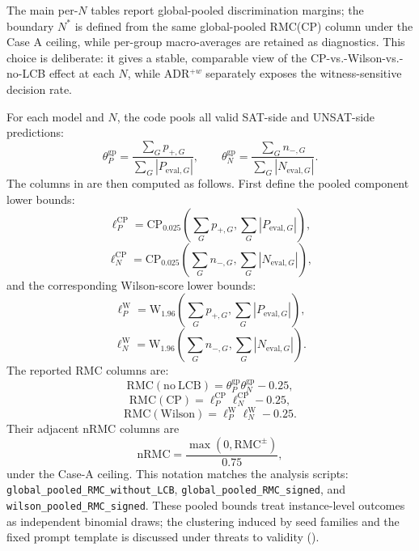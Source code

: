 \documentclass[conference]{IEEEtran}
\theoremstyle{remark}
\newcommand{\RMC}{\mathrm{RMC}}
\begin{document}
The main per-$N$ tables report global-pooled discrimination margins; the
boundary $N^*$ is defined from the same global-pooled RMC(CP) column under the
Case A ceiling, while per-group macro-averages are retained as diagnostics.
This choice is deliberate: it gives a stable, comparable view of the
CP-vs.-Wilson-vs.-no-LCB effect at each $N$, while ADR$^{+w}$ separately exposes
the witness-sensitive decision rate.

For each model and $N$, the code pools all valid SAT-side and UNSAT-side
predictions:
\begin{equation}\label{eq:formula-54}
\theta_P^{\mathrm{gp}}
=
\frac{\sum_G p_{+,G}}{\sum_G |P_{\mathrm{eval},G}|},
\qquad
\theta_N^{\mathrm{gp}}
=
\frac{\sum_G n_{-,G}}{\sum_G |N_{\mathrm{eval},G}|}.
\end{equation}
The columns in  are then computed as follows.
First define the pooled component lower bounds:
\begin{equation}\label{eq:formula-55}
\ell_P^{\mathrm{CP}}
=
\mathrm{CP}_{0.025}
\!\left(
\sum_G p_{+,G},
\sum_G |P_{\mathrm{eval},G}|
\right),
\end{equation}
\begin{equation}\label{eq:formula-56}
\ell_N^{\mathrm{CP}}
=
\mathrm{CP}_{0.025}
\!\left(
\sum_G n_{-,G},
\sum_G |N_{\mathrm{eval},G}|
\right),
\end{equation}
and the corresponding Wilson-score lower bounds:
\begin{equation}\label{eq:formula-57}
\ell_P^{\mathrm{W}}
=
\mathrm{W}_{1.96}
\!\left(
\sum_G p_{+,G},
\sum_G |P_{\mathrm{eval},G}|
\right),
\end{equation}
\begin{equation}\label{eq:formula-58}
\ell_N^{\mathrm{W}}
=
\mathrm{W}_{1.96}
\!\left(
\sum_G n_{-,G},
\sum_G |N_{\mathrm{eval},G}|
\right).
\end{equation}
The reported RMC columns are:
\begin{equation}\label{eq:formula-59}
\mathrm{RMC}(\mathrm{no\ LCB})
=
\theta_P^{\mathrm{gp}}\theta_N^{\mathrm{gp}}
-
0.25,
\end{equation}
\begin{equation}\label{eq:formula-60}
\mathrm{RMC}(\mathrm{CP})
=
\ell_P^{\mathrm{CP}}\ell_N^{\mathrm{CP}}
-
0.25,
\end{equation}
\begin{equation}\label{eq:formula-61}
\mathrm{RMC}(\mathrm{Wilson})
=
\ell_P^{\mathrm{W}}\ell_N^{\mathrm{W}}
-
0.25.
\end{equation}
Their adjacent $\mathrm{nRMC}$ columns are
\begin{equation}\label{eq:formula-62}
\mathrm{nRMC}
=
\frac{\max(0,\RMC^{\pm})}{0.75},
\end{equation}
under the Case-A ceiling.
This notation matches the analysis scripts:
\texttt{global\_pooled\_RMC\_without\_LCB},
\texttt{global\_pooled\_RMC\_signed}, and
\texttt{wilson\_pooled\_RMC\_signed}.
These pooled bounds treat instance-level outcomes as independent binomial
draws; the clustering induced by seed families and the fixed prompt template is
discussed under threats to validity ().
\end{document}
